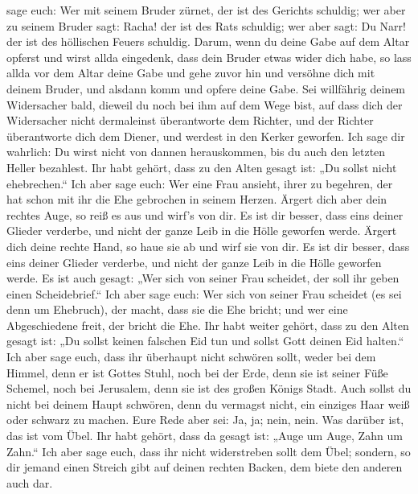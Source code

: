 sage euch: Wer mit seinem Bruder zürnet, der ist des Gerichts schuldig;
wer aber zu seinem Bruder sagt: Racha! der ist des Rats schuldig; wer
aber sagt: Du Narr! der ist des höllischen Feuers schuldig.
 Darum, wenn du deine Gabe auf dem Altar opferst und
wirst allda eingedenk, dass dein Bruder etwas wider dich habe,
 so lass allda vor dem Altar deine Gabe und gehe zuvor
hin und versöhne dich mit deinem Bruder, und alsdann komm und opfere
deine Gabe.  Sei willfährig deinem Widersacher bald,
dieweil du noch bei ihm auf dem Wege bist, auf dass dich der Widersacher
nicht dermaleinst überantworte dem Richter, und der Richter überantworte
dich dem Diener, und werdest in den Kerker geworfen.  Ich
sage dir wahrlich: Du wirst nicht von dannen herauskommen, bis du auch
den letzten Heller bezahlest.  Ihr habt gehört, dass zu
den Alten gesagt ist: „Du sollst nicht ehebrechen.``  Ich
aber sage euch: Wer eine Frau ansieht, ihrer zu begehren, der hat schon
mit ihr die Ehe gebrochen in seinem Herzen.  Ärgert dich
aber dein rechtes Auge, so reiß es aus und wirf's von dir. Es ist dir
besser, dass eins deiner Glieder verderbe, und nicht der ganze Leib in
die Hölle geworfen werde.  Ärgert dich deine rechte Hand,
so haue sie ab und wirf sie von dir. Es ist dir besser, dass eins deiner
Glieder verderbe, und nicht der ganze Leib in die Hölle geworfen werde.
 Es ist auch gesagt: „Wer sich von seiner Frau scheidet,
der soll ihr geben einen Scheidebrief.``  Ich aber sage
euch: Wer sich von seiner Frau scheidet (es sei denn um Ehebruch), der
macht, dass sie die Ehe bricht; und wer eine Abgeschiedene freit, der
bricht die Ehe.  Ihr habt weiter gehört, dass zu den
Alten gesagt ist: „Du sollst keinen falschen Eid tun und sollst Gott
deinen Eid halten.``  Ich aber sage euch, dass ihr
überhaupt nicht schwören sollt, weder bei dem Himmel, denn er ist Gottes
Stuhl,  noch bei der Erde, denn sie ist seiner Füße
Schemel, noch bei Jerusalem, denn sie ist des großen Königs Stadt.
 Auch sollst du nicht bei deinem Haupt schwören, denn du
vermagst nicht, ein einziges Haar weiß oder schwarz zu machen.
 Eure Rede aber sei: Ja, ja; nein, nein. Was darüber ist,
das ist vom Übel.  Ihr habt gehört, dass da gesagt ist:
„Auge um Auge, Zahn um Zahn.``  Ich aber sage euch, dass
ihr nicht widerstreben sollt dem Übel; sondern, so dir jemand einen
Streich gibt auf deinen rechten Backen, dem biete den anderen auch dar.
